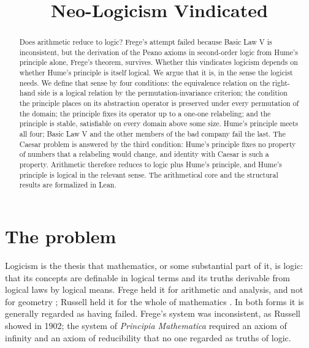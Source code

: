 \documentclass{situationist-preprint}
\title{Neo-Logicism Vindicated}
\begin{document}
\maketitle

\begin{abstract}
Does arithmetic reduce to logic? Frege's attempt failed because Basic Law V is inconsistent, but the derivation of the Peano axioms in second-order logic from Hume's principle alone, Frege's theorem, survives. Whether this vindicates logicism depends on whether Hume's principle is itself logical. We argue that it is, in the sense the logicist needs. We define that sense by four conditions: the equivalence relation on the right-hand side is a logical relation by the permutation-invariance criterion; the condition the principle places on its abstraction operator is preserved under every permutation of the domain; the principle fixes its operator up to a one-one relabeling; and the principle is stable, satisfiable on every domain above some size. Hume's principle meets all four; Basic Law V and the other members of the bad company fail the last. The Caesar problem is answered by the third condition: Hume's principle fixes no property of numbers that a relabeling would change, and identity with Caesar is such a property. Arithmetic therefore reduces to logic plus Hume's principle, and Hume's principle is logical in the relevant sense. The arithmetical core and the structural results are formalized in Lean.
\end{abstract}

\section{The problem}\label{s:problem}

Logicism is the thesis that mathematics, or some substantial part of it, is logic: that its concepts are definable in logical terms and its truths derivable from logical laws by logical means. Frege held it for arithmetic and analysis, and not for geometry \citep{Frege1884}; Russell held it for the whole of mathematics \citep{WhiteheadRussell1910}. In both forms it is generally regarded as having failed. Frege's system was inconsistent, as Russell showed in 1902; the system of \emph{Principia Mathematica} required an axiom of infinity and an axiom of reducibility that no one regarded as truths of logic.
\end{document}
